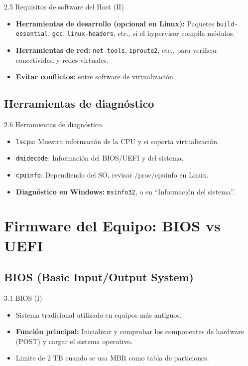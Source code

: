 \documentclass{beamer}
\begin{document}
\begin{frame}{2.5 Requisitos de software del Host (II)}
    \begin{itemize}
        \item \textbf{Herramientas de desarrollo (opcional en Linux):} Paquetes \texttt{build-essential}, \texttt{gcc}, \texttt{linux-headers}, etc., si el hypervisor compila módulos.
        \item \textbf{Herramientas de red:} \texttt{net-tools}, \texttt{iproute2}, etc., para verificar conectividad y redes virtuales.
        \item \textbf{Evitar conflictos:} entre software de virtualización
    \end{itemize}
\end{frame}

\subsection{Herramientas de diagnóstico}
\begin{frame}{2.6 Herramientas de diagnóstico}
    \begin{itemize}
        \item \texttt{lscpu}: Muestra información de la CPU y si soporta virtualización.
        \item \texttt{dmidecode}: Información del BIOS/UEFI y del sistema.
        \item \texttt{cpuinfo}: Dependiendo del SO, revisar /proc/cpuinfo en Linux.
        \item \textbf{Diagnóstico en Windows:} \texttt{msinfo32}, o en “Información del sistema”.
    \end{itemize}
\end{frame}

\section{Firmware del Equipo: BIOS vs UEFI}

\subsection{BIOS (Basic Input/Output System)}
\begin{frame}{3.1 BIOS (I)}
    \begin{itemize}
        \item Sistema tradicional utilizado en equipos más antiguos.
        \item \textbf{Función principal:} Inicializar y comprobar los componentes de hardware (POST) y cargar el sistema operativo.
        \item Limite de 2 TB cuando se usa MBR como tabla de particiones.
    \end{itemize}
\end{frame}
\end{document}
